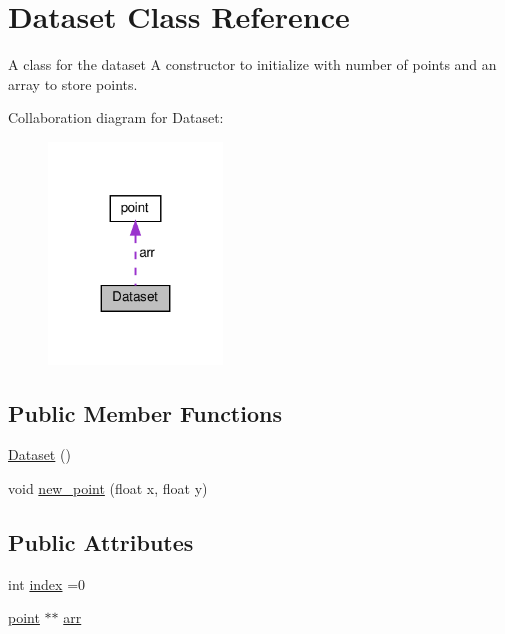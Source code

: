 \hypertarget{classDataset}{}\section{Dataset Class Reference}
\label{classDataset}


A class for the dataset  A constructor to initialize with number of points and an array to store points.  




Collaboration diagram for Dataset\+:\nopagebreak
\begin{figure}[H]
\begin{center}
\leavevmode
\includegraphics[width=131pt]{classDataset__coll__graph}
\end{center}
\end{figure}
\subsection*{Public Member Functions}
\begin{DoxyCompactItemize}
\item 
\hyperlink{classDataset_a2ef0a4a688a218d55ef061c6df659a4a}{Dataset} ()
\item 
void \hyperlink{classDataset_ad5ab44474be3c0648df25f3752916576}{new\+\_\+point} (float x, float y)
\end{DoxyCompactItemize}
\subsection*{Public Attributes}
\begin{DoxyCompactItemize}
\item 
int \hyperlink{classDataset_aed9a6877e5e1483ea47d1f6e39e404f0}{index} =0
\item 
\hyperlink{classpoint}{point} $\ast$$\ast$ \hyperlink{classDataset_acd70fa206d8b0a819a07a658f700f9bf}{arr}
\end{DoxyCompactItemize}


